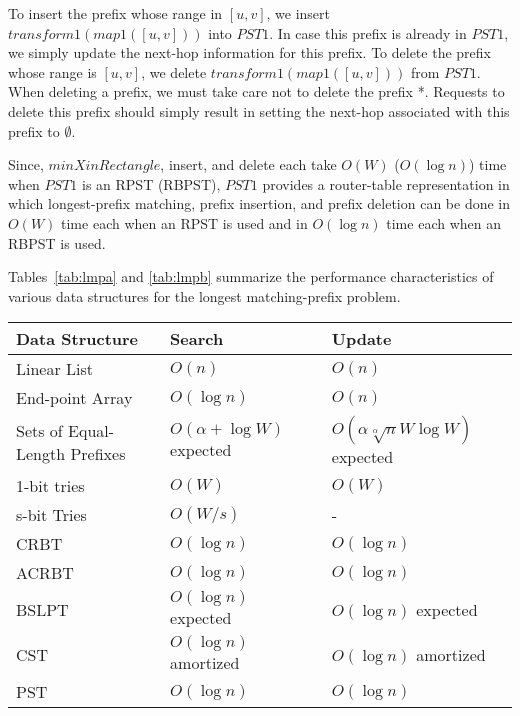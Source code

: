 To insert the prefix whose range in $[u,v]$, we insert $transform1(map1([u,v]))$
into $PST1$. In case this prefix is already in $PST1$, we simply
update the next-hop information for this prefix.
To delete the prefix whose range is $[u,v]$, we delete $transform1(map1([u,v]))$
from $PST1$.
When deleting a prefix, we must take care not to delete the prefix *.
Requests to delete this prefix should simply result in setting the
next-hop associated with this prefix to $\emptyset$.

Since, $minXinRectangle$, insert, and delete each take $O(W)$
($O(\log n)$) time when $PST1$ is
an RPST (RBPST), $PST1$ provides a router-table representation
in which longest-prefix matching, prefix insertion, and prefix deletion
can be done in $O(W)$ time each when an RPST is used and in
$O(\log n)$ time each when an RBPST is used.

Tables~\ref{tab:lmpa} and \ref{tab:lmpb}
summarize the performance characteristics of various data structures for
the longest matching-prefix problem.


\begin{table*}
\centering
\begin{tabular}{|p{2in}|l|l|} 
Data Structure                   & Search    & Update    \\ \hline
Linear List                      & $O(n)$                & $O(n)$                 \\ \hline
End-point Array & $O(\log n)$           & $O(n)$                \\ \hline
Sets of Equal-Length Prefixes   & $O(\alpha+\log W)$ expected    & $O(\alpha \sqrt[\alpha]{n}W\log W)$ expected \\ \hline
1-bit tries    & $O(W)$                & $O(W)$                 \\ \hline
s-bit Tries             & $O(W/s)$              & -                     \\ \hline
CRBT                             & $O(\log n)$           & $O(\log n)$           \\ \hline
ACRBT                            & $O(\log n)$           & $O(\log n)$           \\ \hline
BSLPT                            & $O(\log n)$ expected  & $O(\log n)$ expected   \\ \hline
CST                              & $O(\log n)$ amortized & $O(\log n)$ amortized \\ \hline
PST                              & $O(\log n)$           & $O(\log n)$            \\
\end{tabular}
\caption{Time complexity of data structures for longest matching-prefix}
\label{tab:lmpa}
\end{table*}

